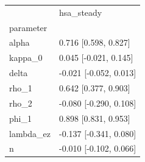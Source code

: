 \begin{tabular}{ll}
\toprule
 & hsa\_steady \\
parameter &  \\
\midrule
alpha & 0.716 [0.598, 0.827] \\
kappa\_0 & 0.045 [-0.021, 0.145] \\
delta & -0.021 [-0.052, 0.013] \\
rho\_1 & 0.642 [0.377, 0.903] \\
rho\_2 & -0.080 [-0.290, 0.108] \\
phi\_1 & 0.898 [0.831, 0.953] \\
lambda\_ez & -0.137 [-0.341, 0.080] \\
n & -0.010 [-0.102, 0.066] \\
\bottomrule
\end{tabular}
